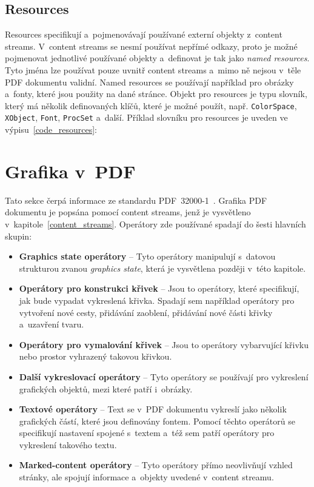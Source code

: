 \subsection*{Resources} \label{resources}
Resources specifikují a~pojmenovávají používané externí objekty z~content streams.
V~content streams se nesmí používat nepřímé odkazy, proto je možné pojmenovat
jednotlivé používané objekty a~definovat je tak jako \emph{named resources}.
Tyto jména lze používat pouze uvnitř content streams a~mimo ně nejsou v~těle PDF
dokumentu validní. Named resources se používají například pro obrázky a~fonty,
které jsou použity na dané stránce. Objekt pro resources je typu slovník, který
má několik definovaných klíčů, které je možné použít, např. \texttt{ColorSpace}, 
\texttt{XObject}, \texttt{Font}, \texttt{ProcSet} a~další. Příklad slovníku pro
resources je uveden ve výpisu~\ref{code_resources}:



\section{Grafika v~PDF}
Tato sekce čerpá informace ze standardu PDF~32000-1~\cite[k.~8, s.~110--236]{PDF32000-1:2008}.
Grafika PDF dokumentu je popsána pomocí content streams, jenž je vysvětleno
v~kapitole~\ref{content_streams}. Operátory zde používané spadají do šesti
hlavních skupin:
\begin{itemize}
    \item \textbf{Graphics state operátory} -- Tyto operátory manipulují
    s~datovou strukturou zvanou \emph{graphics state}, která je vysvětlena později
    v~této kapitole.
    \item \textbf{Operátory pro konstrukci křivek} -- Jsou to operátory, které
    specifikují, jak bude vypadat vykreslená křivka. Spadají sem například
    operátory pro vytvoření nové cesty, přidávání zaoblení, přidávání nové části
    křivky a~uzavření tvaru.
    \item \textbf{Operátory pro vymalování křivek} -- Jsou to operátory vybarvující
    křivku nebo prostor vyhrazený takovou křivkou.
    \item \textbf{Další vykreslovací operátory} -- Tyto operátory se používají
    pro vykreslení grafických objektů, mezi které patří i~obrázky.
    \item \textbf{Textové operátory} -- Text se v~PDF dokumentu vykreslí jako několik
    grafických částí, které jsou definovány fontem. Pomocí těchto operátorů
    se specifikují nastavení spojené s~textem a~též sem patří operátory pro
    vykreslení takového textu. 
    \item \textbf{Marked-content operátory} -- Tyto operátory přímo neovlivňují
    vzhled stránky, ale spojují informace a~objekty uvedené v~content streamu.
\end{itemize}


